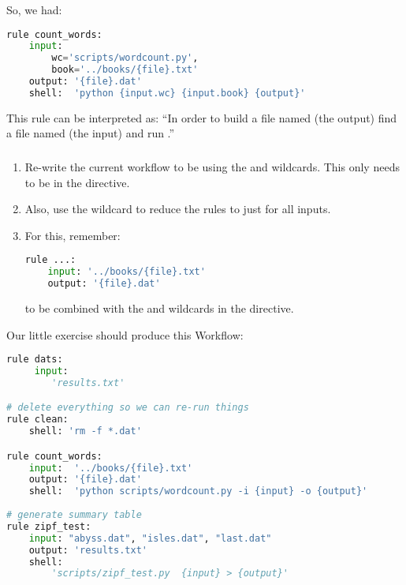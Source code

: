 \begin{frame}[fragile]
  So, we had:
    \begin{lstlisting}[language=Python,style=Python]
  rule count_words:
    input:
        wc='scripts/wordcount.py',
        book='../books/{file}.txt'
    output: '{file}.dat'
    shell:  'python {input.wc} {input.book} {output}'   
    \end{lstlisting}
    \begin{block}{This rule can be interpreted as:}
``In order to build a file named  (the output) find a file named  (the input) and run .''
  \end{block}
\end{frame}

\begingroup
{}
\begin{frame}[fragile]
  \frametitle{}
  \begin{enumerate}
   \item Re-write the current workflow to be using the  and  wildcards. This only needs to be in the  directive.
   \item Also, use the  wildcard to reduce the  rules to just  for all inputs.
   \item For this, remember:
         \begin{lstlisting}[language=Python,style=Python]
rule ...:
    input: '../books/{file}.txt'
    output: '{file}.dat'
         \end{lstlisting}
         to be combined with the  and  wildcards in the  directive.
  \end{enumerate}
  \vfill
\end{frame}
\endgroup


\begin{frame}[fragile]
Our little exercise should produce this Workflow:
      \begin{lstlisting}[language=Python,style=Python, basicstyle=\tiny]
rule dats:
     input:
        'results.txt'

# delete everything so we can re-run things
rule clean:
    shell: 'rm -f *.dat'

rule count_words:
    input:  '../books/{file}.txt'
    output: '{file}.dat'
    shell:  'python scripts/wordcount.py -i {input} -o {output}'
    
# generate summary table
rule zipf_test:
    input: "abyss.dat", "isles.dat", "last.dat"
    output: 'results.txt'
    shell:  
        'scripts/zipf_test.py  {input} > {output}'
      \end{lstlisting}

\end{frame}
